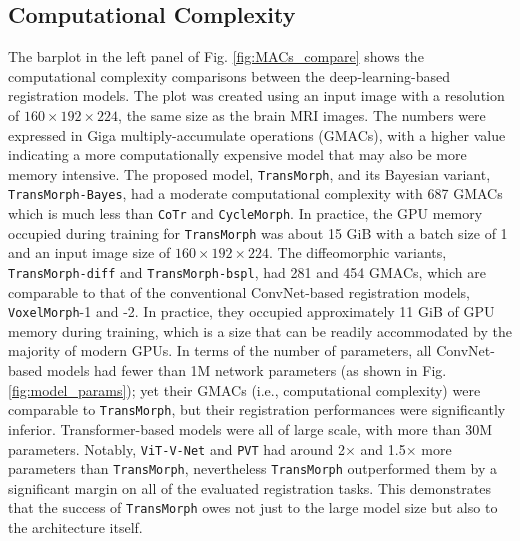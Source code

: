 \documentclass[times,twocolumn,final]{elsarticle}
\begin{document}
\subsection{Computational Complexity}
The barplot in the left panel of Fig. \ref{fig:MACs_compare} shows the computational complexity comparisons between the deep-learning-based registration models. The plot was created using an input image with a resolution of $160\times192\times224$, the same size as the brain MRI images. The numbers were expressed in Giga multiply-accumulate operations (GMACs), with a higher value indicating a more computationally expensive model that may also be more memory intensive. The proposed model, \texttt{TransMorph}, and its Bayesian variant, \texttt{TransMorph-Bayes}, had a moderate computational complexity with 687 GMACs which is much less than \texttt{CoTr} and \texttt{CycleMorph}. In practice, the GPU memory occupied during training for \texttt{TransMorph} was about 15 GiB with a batch size of 1 and an input image size of $160\times192\times224$. The diffeomorphic variants, \texttt{TransMorph-diff} and \texttt{TransMorph-bspl}, had 281 and 454 GMACs, which are comparable to that of the conventional ConvNet-based registration models, \texttt{VoxelMorph}-1 and -2. In practice, they occupied approximately 11 GiB of GPU memory during training, which is a size that can be readily accommodated by the majority of modern GPUs. In terms of the number of parameters, all ConvNet-based models had fewer than 1M network parameters (as shown in Fig. \ref{fig:model_params}); yet their GMACs (i.e., computational complexity) were comparable to \texttt{TransMorph}, but their registration performances were significantly inferior. Transformer-based models were all of large scale, with more than 30M parameters. Notably, \texttt{ViT-V-Net} and \texttt{PVT} had around 2$\times$ and 1.5$\times$ more parameters than \texttt{TransMorph}, nevertheless \texttt{TransMorph} outperformed them by a significant margin on all of the evaluated registration tasks. This demonstrates that the success of \texttt{TransMorph} owes not just to the large model size but also to the architecture itself.
\end{document}
